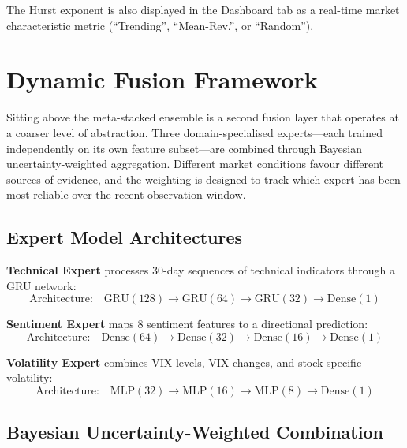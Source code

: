 \documentclass[10pt,a4paper,twoside]{article}
\begin{document}
The Hurst exponent is also displayed in the Dashboard tab as a real-time
market characteristic metric (``Trending'', ``Mean-Rev.'', or ``Random'').

\section{Dynamic Fusion Framework}
\label{sec:fusion}

Sitting above the meta-stacked ensemble is a second fusion layer that operates
at a coarser level of abstraction. Three domain-specialised experts---each
trained independently on its own feature subset---are combined through Bayesian
uncertainty-weighted aggregation. Different market conditions favour different
sources of evidence, and the weighting is designed to track which expert has
been most reliable over the recent observation window.

\subsection{Expert Model Architectures}

\textbf{Technical Expert} processes 30-day sequences of technical indicators
through a GRU network:
\begin{equation}
  \text{Architecture:}\quad \text{GRU}(128) \to \text{GRU}(64) \to \text{GRU}(32) \to \text{Dense}(1)
\end{equation}

\textbf{Sentiment Expert} maps 8 sentiment features to a directional prediction:
\begin{equation}
  \text{Architecture:}\quad \text{Dense}(64) \to \text{Dense}(32) \to \text{Dense}(16) \to \text{Dense}(1)
\end{equation}

\textbf{Volatility Expert} combines VIX levels, VIX changes, and stock-specific
volatility:
\begin{equation}
  \text{Architecture:}\quad \text{MLP}(32) \to \text{MLP}(16) \to \text{MLP}(8) \to \text{Dense}(1)
\end{equation}

\subsection{Bayesian Uncertainty-Weighted Combination}
\end{document}
